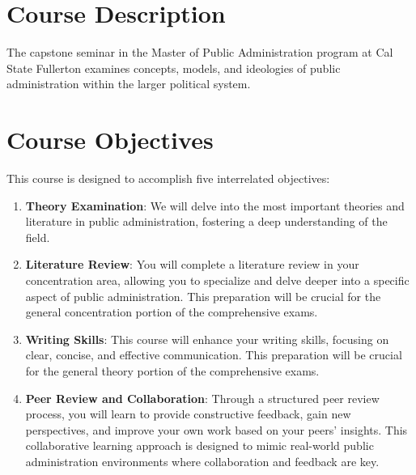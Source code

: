 \documentclass[12pt, letterpaper]{article}
\begin{document}
    \section{Course Description}
    The capstone seminar in the Master of Public Administration program at Cal State Fullerton examines concepts, models, and ideologies of public administration within the larger political system.
    
    \section{Course Objectives}
    This course is designed to accomplish five interrelated objectives:
    
    \begin{enumerate}
        \item \textbf{Theory Examination}: We will delve into the most important theories and literature in public administration, fostering a deep understanding of the field.
        \item \textbf{Literature Review}: You will complete a literature review in your concentration area, allowing you to specialize and delve deeper into a specific aspect of public administration. This preparation will be crucial for the general concentration portion of the comprehensive exams.
        \item \textbf{Writing Skills}: This course will enhance your writing skills, focusing on clear, concise, and effective communication. This preparation will be crucial for the general theory portion of the comprehensive exams.
        \item \textbf{Peer Review and Collaboration}: Through a structured peer review process, you will learn to provide constructive feedback, gain new perspectives, and improve your own work based on your peers’ insights. This collaborative learning approach is designed to mimic real-world public administration environments where collaboration and feedback are key.
    \end{enumerate}
    
\end{document}
